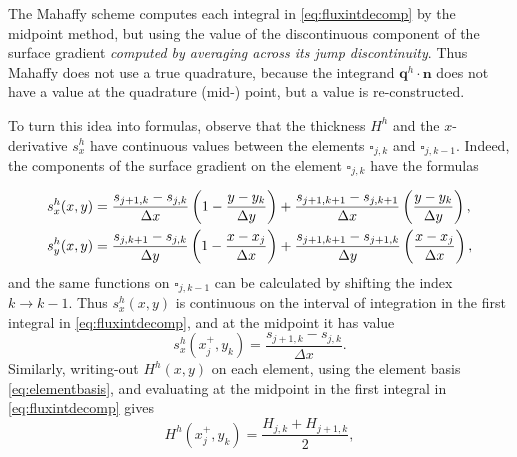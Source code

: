 \documentclass[twocolumn]{igs}
\newcommand\bn{\mathbf{n}}
\newcommand\bq{\mathbf{q}}
\begin{document}
The Mahaffy scheme computes each integral in \eqref{eq:fluxintdecomp} by the midpoint method, but using the value of the discontinuous component of the surface gradient \emph{computed by averaging across its jump discontinuity}.  Thus Mahaffy does not use a true quadrature, because the integrand $\bq^h\cdot \bn$ does not have a value at the quadrature (mid-) point, but a value is re-constructed.

To turn this idea into formulas, observe that the thickness $H^h$ and the $x$-derivative $s^h_x$ have continuous values between the elements $\square_{j,k}$ and $\square_{j,k-1}$.  Indeed, the components of the surface gradient on the element $\square_{j,k}$ have the formulas
	\begin{comment}
	COMMENT OUT: here is the surface elevation on $\square_{j,k}$
	\begin{align*}
	s^h(x,y) &= s_{j,k} \left(1-\tfrac{x-x_j}{\Delta x}\right) \left(1-\tfrac{y-y_k}{\Delta y}\right)
	    + s_{j+1,k} \left(\tfrac{x-x_j}{\Delta x}\right) \left(1-\tfrac{y-y_k}{\Delta y}\right) \\
	         &\qquad + s_{j,k+1} \left(1-\tfrac{x-x_j}{\Delta x}\right) \left(\tfrac{y-y_k}{\Delta y}\right)
	    + s_{j+1,k+1} \left(\tfrac{x-x_j}{\Delta x}\right) \left(\tfrac{y-y_k}{\Delta y}\right)
	\end{align*}
	\end{comment}
\begin{align}
s^h_x(x,y) &= \frac{s_{j+1,k}-s_{j,k}}{\Delta x} \left(1-\frac{y-y_k}{\Delta y}\right) + \frac{s_{j+1,k+1}-s_{j,k+1}}{\Delta x} \left(\frac{y-y_k}{\Delta y}\right), \label{eq:grads} \\
s^h_y(x,y) &= \frac{s_{j,k+1}-s_{j,k}}{\Delta y} \left(1-\frac{x-x_j}{\Delta x}\right) + \frac{s_{j+1,k+1}-s_{j+1,k}}{\Delta y} \left(\frac{x-x_j}{\Delta x}\right), \notag
\end{align}
and the same functions on $\square_{j,k-1}$ can be calculated by shifting the index $k\to k-1$.  Thus $s^h_x(x,y)$ is continuous on the interval of integration in the first integral in \eqref{eq:fluxintdecomp}, and at the midpoint it has value
\begin{equation}
s^h_x(x_j^+,y_k) = \frac{s_{j+1,k}-s_{j,k}}{\Delta x}. \label{eq:femsxstag}
\end{equation}
Similarly, writing-out $H^h(x,y)$ on each element, using the element basis \eqref{eq:elementbasis}, and evaluating at the midpoint in the first integral in \eqref{eq:fluxintdecomp} gives
\begin{equation}
H^h(x_j^+,y_k) = \frac{H_{j,k}+H_{j+1,k}}{2}, \label{eq:femHstag}
\end{equation}
\end{document}
